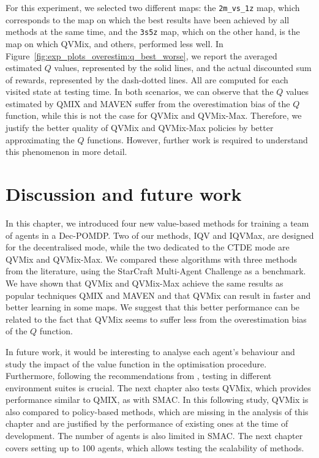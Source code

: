 For this experiment, we selected two different maps: the \texttt{2m\_vs\_1z} map, which corresponds to the map on which the best results have been achieved by all methods at the same time, and the \texttt{3s5z} map, which on the other hand, is the map on which QVMix, and others, performed less well.
In Figure~\ref{fig:exp_plots_overestim:q_best_worse}, we report the averaged estimated $Q$ values, represented by the solid lines, and the actual discounted sum of rewards, represented by the dash-dotted lines.
All are computed for each visited state at testing time.
In both scenarios, we can observe that the $Q$ values estimated by QMIX and MAVEN suffer from the overestimation bias of the $Q$ function, while this is not the case for QVMix and QVMix-Max.
Therefore, we justify the better quality of QVMix and QVMix-Max policies by better approximating the $Q$ functions.
However, further work is required to understand this phenomenon in more detail.

\section{Discussion and future work} \label{sec:ch4_conclusion}

In this chapter, we introduced four new value-based methods for training a team of agents in a Dec-POMDP.
Two of our methods, IQV and IQVMax, are designed for the decentralised mode, while the two dedicated to the CTDE mode are QVMix and QVMix-Max.
We compared these algorithms with three methods from the literature, using the StarCraft Multi-Agent Challenge as a benchmark.
We have shown that QVMix and QVMix-Max achieve the same results as popular techniques QMIX and MAVEN and that QVMix can result in faster and better learning in some maps.
We suggest that this better performance can be related to the fact that QVMix seems to suffer less from the overestimation bias of the $Q$ function.

In future work, it would be interesting to analyse each agent's behaviour and study the impact of the value function in the optimisation procedure.
Furthermore, following the recommendations from \citep{gorsane2022towards}, testing in different environment suites is crucial. 
The next chapter also tests QVMix, which provides performance similar to QMIX, as with SMAC.
In this following study, QVMix is also compared to policy-based methods, which are missing in the analysis of this chapter and are justified by the performance of existing ones at the time of development.
The number of agents is also limited in SMAC.
The next chapter covers setting up to 100 agents, which allows testing the scalability of methods.

